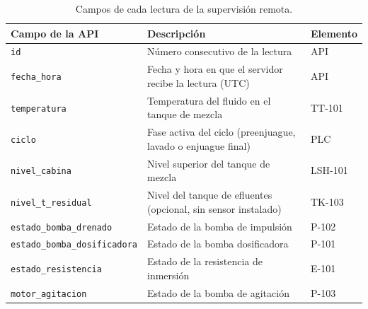 \begin{table}[H]
\centering
\small
\caption{Campos de cada lectura de la supervisión remota.}
\label{tab:variables_api}
\begin{tabularx}{\textwidth}{L{5.0cm}YL{2.4cm}}
\toprule
\textbf{Campo de la API} & \textbf{Descripción} & \textbf{Elemento}\\
\midrule
\texttt{id} & Número consecutivo de la lectura & API\\
\texttt{fecha\_hora} & Fecha y hora en que el servidor recibe la lectura (UTC) & API\\
\texttt{temperatura} & Temperatura del fluido en el tanque de mezcla & TT-101\\
\texttt{ciclo} & Fase activa del ciclo (preenjuague, lavado o enjuague final) & PLC\\
\texttt{nivel\_cabina} & Nivel superior del tanque de mezcla & LSH-101\\
\texttt{nivel\_t\_residual} & Nivel del tanque de efluentes (opcional, sin sensor instalado) & TK-103\\
\texttt{estado\_bomba\_drenado} & Estado de la bomba de impulsión & P-102\\
\texttt{estado\_bomba\_dosificadora} & Estado de la bomba dosificadora & P-101\\
\texttt{estado\_resistencia} & Estado de la resistencia de inmersión & E-101\\
\texttt{motor\_agitacion} & Estado de la bomba de agitación & P-103\\
\bottomrule
\end{tabularx}
\end{table}
